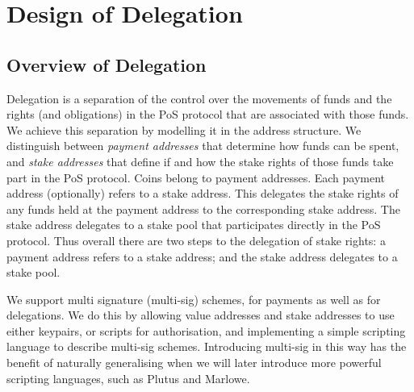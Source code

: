 \documentclass[11pt,a4paper,dvipsnames,twosided]{article}
\begin{document}
\section{Design of Delegation}
\label{design-of-delegation}

\newcommand{\hash}[1]{\ensuremath{\mathcal{H}(#1)}}

\subsection{Overview of Delegation}
\label{overview-of-delegation}

Delegation is a separation of the control over the movements of funds and the
rights (and obligations) in the PoS protocol that are associated with those
funds. We achieve this separation by modelling it in the address structure. We
distinguish between \emph{payment addresses} that determine how funds can be
spent, and \emph{stake addresses} that define if and how the stake rights of
those funds take part in the PoS protocol. Coins belong to payment addresses.
Each payment address (optionally) refers to a stake address. This delegates the
stake rights of any funds held at the payment address to the corresponding stake
address. The stake address delegates to a stake pool that participates directly
in the PoS protocol. Thus overall there are two steps to the delegation of stake
rights: a payment address refers to a stake address; and the stake address
delegates to a stake pool.

We support multi signature (multi-sig) schemes, for payments as well as for
delegations. We do this by allowing value addresses and stake addresses to use
either keypairs, or scripts for authorisation, and implementing a simple
scripting language to describe multi-sig schemes. Introducing multi-sig in this
way has the benefit of naturally generalising when we will later introduce more
powerful scripting languages, such as Plutus and Marlowe.
\end{document}
